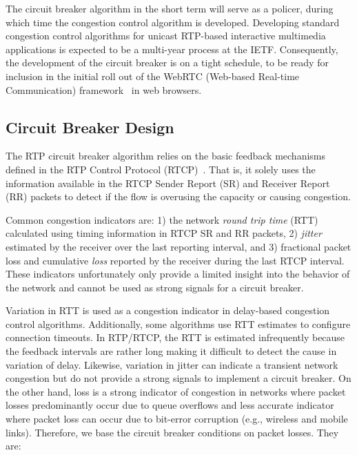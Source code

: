 The circuit breaker algorithm in the short term will serve as a policer,
during which time the congestion control algorithm is developed. Developing
standard congestion control algorithms for unicast RTP-based interactive
multimedia applications is expected to be a multi-year process at the IETF.
Consequently, the development of the circuit breaker is on a tight schedule,
to be ready for inclusion in the initial roll out of the WebRTC (Web-based
Real-time Communication) framework~\cite{jennings:2013:webrtc} in web
browsers.

\subsection{Circuit Breaker Design}

The RTP circuit breaker algorithm relies on the basic feedback mechanisms
defined in the RTP Control Protocol (RTCP)~\cite{rfc3550}. That is, it solely
uses the information available in the RTCP Sender Report (SR) and Receiver
Report (RR) packets to detect if the flow is overusing the capacity or causing
congestion.

Common congestion indicators are: 1) the network \emph{round trip time} (RTT)
calculated  using timing information in RTCP SR and RR packets, 2)
\emph{jitter} estimated by the receiver over the last reporting interval, and
3) fractional packet loss and cumulative \emph{loss} reported by the receiver
during the last RTCP interval. These indicators  unfortunately only provide a
limited insight into the behavior of the network and cannot be used as strong
signals for a circuit breaker.

Variation in RTT is used as a congestion indicator in delay-based congestion
control  algorithms. Additionally, some algorithms use RTT estimates to
configure connection timeouts. In RTP/RTCP, the RTT is estimated infrequently
because the feedback intervals are rather long making it difficult to detect
the cause in  variation of delay. Likewise, variation in jitter can indicate a
transient network congestion but do not  provide a strong signals to implement
a circuit breaker. On the other hand, loss is a strong indicator of congestion
in networks where  packet losses predominantly occur due to queue overflows
and less accurate indicator where packet loss can occur due to bit-error
corruption (e.g., wireless  and mobile links). Therefore, we base the circuit
breaker conditions on packet losses. They are:

